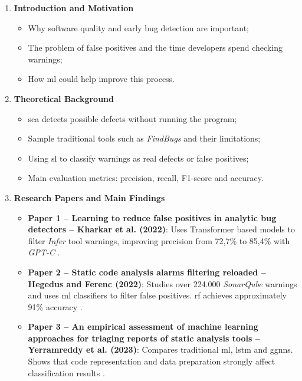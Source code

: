 \begin{enumerate}
    \item \textbf{Introduction and Motivation}
    \begin{itemize}
        \item Why software quality and early bug detection are important;
        \item The problem of false positives and the time developers spend checking warnings;
        \item How \gls{ml} could help improve this process.
    \end{itemize}

    \item \textbf{Theoretical Background}
    \begin{itemize}
        \item \gls{sca} detects possible defects without running the program;
        \item Sample traditional tools such as \textit{FindBugs} and their limitations;
        \item Using \gls{sl} to classify warnings as real defects or false positives;
        \item Main evaluation metrics: precision, recall, F1-score and accuracy.
    \end{itemize}

    \item \textbf{Research Papers and Main Findings}
    \begin{itemize}
        \item \textbf{Paper 1 -- Learning to reduce false positives in analytic bug detectors -- Kharkar et al. (2022)}:
        Uses Transformer based models to filter \textit{Infer} \cite{meta_infer} tool warnings, improving precision from 72,7\% to 85,4\% with \textit{GPT-C} \cite{paper1_kharkarlearning2022}.

        \item \textbf{Paper 2 -- Static code analysis alarms filtering reloaded -- Hegedus and Ferenc (2022)}:
        Studies over 224.000 \textit{SonarQube} \cite{sonarqube_docs} warnings and uses \gls{ml} classifiers to filter false positives. \gls{rf} achieves approximately 91\% accuracy \cite{paper2_hegedHus2022static}.

        \item \textbf{Paper 3 -- An empirical assessment of machine learning approaches for triaging reports of static analysis tools -- Yerramreddy et al. (2023)}:
        Compares traditional \gls{ml}, \gls{lstm} and \gls{ggnns}. Shows that code representation and data preparation strongly affect classification results \cite{paper3_yerramreddy2023empirical}.
    \end{itemize}


\end{enumerate}
